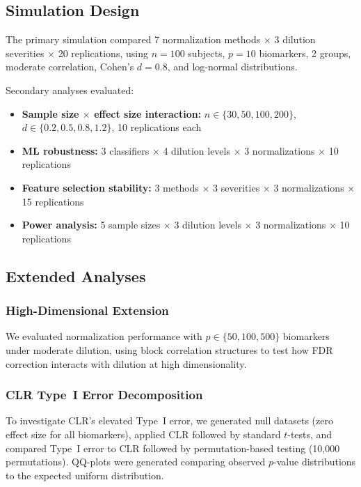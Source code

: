 \documentclass[12pt]{article}
\begin{document}
\subsection{Simulation Design}

The primary simulation compared 7 normalization methods $\times$ 3 dilution severities $\times$ 20 replications, using $n = 100$ subjects, $p = 10$ biomarkers, 2 groups, moderate correlation, Cohen's $d = 0.8$, and log-normal distributions.

Secondary analyses evaluated:
\begin{itemize}
\item \textbf{Sample size $\times$ effect size interaction:} $n \in \{30, 50, 100, 200\}$, $d \in \{0.2, 0.5, 0.8, 1.2\}$, 10 replications each
\item \textbf{ML robustness:} 3 classifiers $\times$ 4 dilution levels $\times$ 3 normalizations $\times$ 10 replications
\item \textbf{Feature selection stability:} 3 methods $\times$ 3 severities $\times$ 3 normalizations $\times$ 15 replications
\item \textbf{Power analysis:} 5 sample sizes $\times$ 3 dilution levels $\times$ 3 normalizations $\times$ 10 replications
\end{itemize}

\subsection{Extended Analyses}

\subsubsection{High-Dimensional Extension}

We evaluated normalization performance with $p \in \{50, 100, 500\}$ biomarkers under moderate dilution, using block correlation structures to test how FDR correction interacts with dilution at high dimensionality.

\subsubsection{CLR Type~I Error Decomposition}

To investigate CLR's elevated Type~I error, we generated null datasets (zero effect size for all biomarkers), applied CLR followed by standard $t$-tests, and compared Type~I error to CLR followed by permutation-based testing (10,000 permutations). QQ-plots were generated comparing observed $p$-value distributions to the expected uniform distribution.
\end{document}
